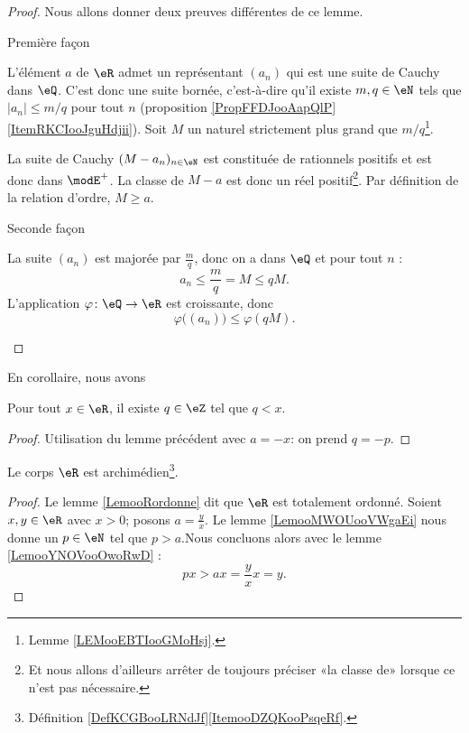 \begin{proof}
    Nous allons donner deux preuves différentes de ce lemme.
    \begin{subproof}
    \item[Première façon]
        
        L'élément \( a\) de \( \eR\) admet un représentant \( (a_n)\) qui est une suite de Cauchy dans \( \eQ\). C'est donc une suite bornée, c'est-à-dire qu'il existe \( m,q\in \eN\) tels que \( | a_n |\leq m/q\) pour tout \( n\) (proposition \ref{PropFFDJooAapQlP}\ref{ItemRKCIooJguHdjii}). Soit \( M\) un naturel strictement plus grand que \( m/q\)\footnote{Lemme \ref{LEMooEBTIooGMoHsj}.}. 

    La suite de Cauchy \( (M-a_n)_{n\in \eN}\) est constituée de rationnels positifs et est donc dans \( \modE^+\). La classe de \( M-a\) est donc un réel positif\footnote{Et nous allons d'ailleurs arrêter de toujours préciser «la classe de» lorsque ce n'est pas nécessaire.}. Par définition de la relation d'ordre, \( M\geq a\).
\item[Seconde façon]

    La suite \( (a_n)\) est majorée par \( \frac{ m }{ q }\), donc on a dans \( \eQ\) et pour tout \( n\) :
    \begin{equation}
        a_n\leq \frac{ m }{ q }=M\leq qM.
    \end{equation}
    L'application \( \varphi\colon \eQ\to \eR\) est croissante, donc
    \begin{equation}
        \varphi\big( (a_n) \big)\leq \varphi(qM).
    \end{equation}
    \end{subproof}
\end{proof}

En corollaire, nous avons
\begin{lemma}      \label{LEMooMWOUooVWgbFi}
    Pour tout \( x\in \eR\), il existe \( q\in \eZ\) tel que \( q < x\). 
\end{lemma}
\begin{proof}
    Utilisation du lemme précédent avec \( a = -x \): on prend \( q = -p \).
\end{proof}

\begin{theorem}        \label{ThoooKJTTooCaxEny}
    Le corps \( \eR\) est archimédien\footnote{Définition \ref{DefKCGBooLRNdJf}\ref{ItemooDZQKooPsqeRf}.}.
\end{theorem}

\begin{proof}
    Le lemme \ref{LemooRordonne} dit que \( \eR\) est totalement ordonné. Soient \( x,y\in \eR\) avec \( x>0\); posons \( a=\frac{ y }{ x }\). Le lemme \ref{LemooMWOUooVWgaEi} nous donne un \( p \in \eN\) tel que \(p > a\).Nous concluons alors avec le lemme \ref{LemooYNOVooOwoRwD} :
    \begin{equation}
        px>ax=\frac{ y }{ x }x=y.
    \end{equation}
\end{proof}

